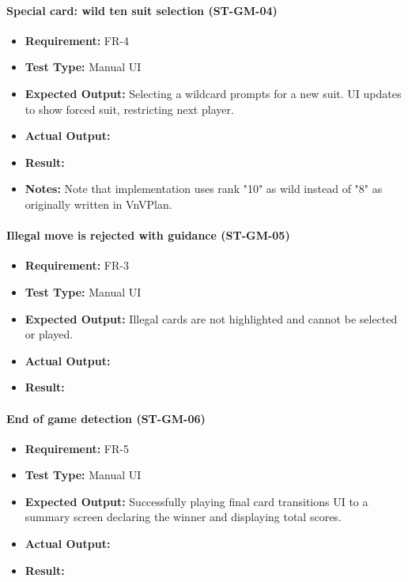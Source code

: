 \documentclass[12pt, titlepage]{article}
\begin{document}
\paragraph{Special card: wild ten suit selection (ST-GM-04)}
\begin{itemize}
  \item \textbf{Requirement:} FR-4
  \item \textbf{Test Type:} Manual UI
  \item \textbf{Expected Output:} Selecting a wildcard prompts for a new suit. UI updates to show forced suit, restricting next player.
  \item \textbf{Actual Output:} 
  \item \textbf{Result:} 
  \item \textbf{Notes:} Note that implementation uses rank "10" as wild instead of "8" as originally written in VnVPlan.
\end{itemize}

\paragraph{Illegal move is rejected with guidance (ST-GM-05)}
\begin{itemize}
  \item \textbf{Requirement:} FR-3
  \item \textbf{Test Type:} Manual UI
  \item \textbf{Expected Output:} Illegal cards are not highlighted and cannot be selected or played.
  \item \textbf{Actual Output:} 
  \item \textbf{Result:} 
\end{itemize}

\paragraph{End of game detection (ST-GM-06)}
\begin{itemize}
  \item \textbf{Requirement:} FR-5
  \item \textbf{Test Type:} Manual UI
  \item \textbf{Expected Output:} Successfully playing final card transitions UI to a summary screen declaring the winner and displaying total scores.
  \item \textbf{Actual Output:} 
  \item \textbf{Result:} 
\end{itemize}
\end{document}
